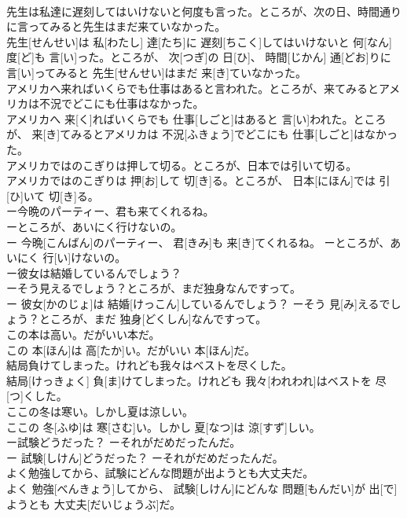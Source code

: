 \documentclass[8pt]{extreport}
\begin{document}
\begin{CJK}{UTF8}{min}
\\	先生は私達に遅刻してはいけないと何度も言った。ところが、次の日、時間通りに言ってみると先生はまだ来ていなかった。	
\\	先生[せんせい]は 私[わたし] 達[たち]に 遅刻[ちこく]してはいけないと 何[なん] 度[ど]も 言[い]った。ところが、 次[つぎ]の 日[ひ]、 時間[じかん] 通[どお]りに 言[い]ってみると 先生[せんせい]はまだ 来[き]ていなかった。
\\	アメリカへ来ればいくらでも仕事はあると言われた。ところが、来てみるとアメリカは不況でどこにも仕事はなかった。	
\\	アメリカへ 来[く]ればいくらでも 仕事[しごと]はあると 言[い]われた。ところが、 来[き]てみるとアメリカは 不況[ふきょう]でどこにも 仕事[しごと]はなかった。
\\	アメリカではのこぎりは押して切る。ところが、日本では引いて切る。	
\\	アメリカではのこぎりは 押[お]して 切[き]る。ところが、 日本[にほん]では 引[ひ]いて 切[き]る。
\\	ー今晩のパーティー、君も来てくれるね。
\\	ーところが、あいにく行けないの。
\\	ー 今晩[こんばん]のパーティー、 君[きみ]も 来[き]てくれるね。 ーところが、あいにく 行[い]けないの。
\\	ー彼女は結婚しているんでしょう？
\\	ーそう見えるでしょう？ところが、まだ独身なんですって。
\\	ー 彼女[かのじょ]は 結婚[けっこん]しているんでしょう？ ーそう 見[み]えるでしょう？ところが、まだ 独身[どくしん]なんですって。
\\	この本は高い。だがいい本だ。	
\\	この 本[ほん]は 高[たか]い。だがいい 本[ほん]だ。
\\	結局負けてしまった。けれども我々はベストを尽くした。	
\\	結局[けっきょく] 負[ま]けてしまった。けれども 我々[われわれ]はベストを 尽[つ]くした。
\\	ここの冬は寒い。しかし夏は涼しい。	
\\	ここの 冬[ふゆ]は 寒[さむ]い。しかし 夏[なつ]は 涼[すず]しい。
\\	ー試験どうだった？ ーそれがだめだったんだ。	
\\	ー 試験[しけん]どうだった？ ーそれがだめだったんだ。
\\	よく勉強してから、試験にどんな問題が出ようとも大丈夫だ。	
\\	よく 勉強[べんきょう]してから、 試験[しけん]にどんな 問題[もんだい]が 出[で]ようとも 大丈夫[だいじょうぶ]だ。

\end{CJK}
\end{document}
